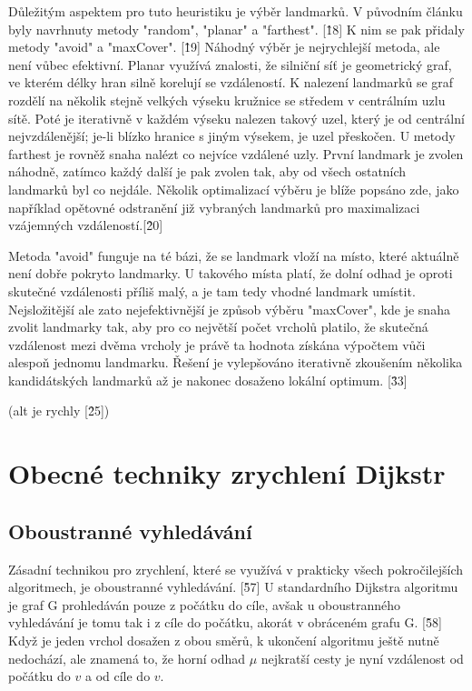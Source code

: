Důležitým aspektem pro tuto heuristiku je výběr landmarků. V původním článku byly navrhnuty metody "random", "planar" a "farthest". [\^18] K nim se pak přidaly metody "avoid" a "maxCover". [\^19] Náhodný výběr je nejrychlejší metoda, ale není vůbec efektivní. Planar využívá znalosti, že silniční síť je geometrický graf, ve kterém délky hran silně korelují se vzdáleností. K nalezení landmarků se graf rozdělí na několik stejně velkých výseku kružnice se středem v centrálním uzlu sítě. Poté je iterativně v každém výseku nalezen takový uzel, který je od centrální nejvzdálenější; je-li blízko hranice s jiným výsekem, je uzel přeskočen. U metody farthest je rovněž snaha nalézt co nejvíce vzdálené uzly. První landmark je zvolen náhodně, zatímco každý další je pak zvolen tak, aby od všech ostatních landmarků byl co nejdále. Několik optimalizací výběru je blíže popsáno zde, jako například opětovné odstranění již vybraných landmarků pro maximalizaci vzájemných vzdáleností.[\^20] 

Metoda "avoid" funguje na té bázi, že se landmark vloží na místo, které aktuálně není dobře pokryto landmarky. U takového místa platí, že dolní odhad je oproti skutečné vzdálenosti příliš malý, a je tam tedy vhodné landmark umístit. Nejsložitější ale zato nejefektivnější je způsob výběru "maxCover", kde je snaha zvolit landmarky tak, aby pro co největší počet vrcholů platilo, že skutečná vzdálenost mezi dvěma vrcholy je právě ta hodnota získána výpočtem vůči alespoň jednomu landmarku. Řešení je vylepšováno iterativně zkoušením několika kandidátských landmarků až je nakonec dosaženo lokální optimum. [\^33]

(alt je rychly [\^25])

\section{Obecné techniky zrychlení Dijkstr}
\subsection{ Oboustranné vyhledávání}
Zásadní technikou pro zrychlení, které se využívá v prakticky všech pokročilejších algoritmech, je oboustranné vyhledávání. [\^57] U standardního Dijkstra algoritmu je graf G prohledáván pouze z počátku do cíle, avšak u oboustranného vyhledávání je tomu tak i z cíle do počátku, akorát v obráceném grafu G. [\^58] Když je jeden vrchol dosažen z obou směrů, k ukončení algoritmu ještě nutně nedochází, ale znamená to, že horní odhad $\mu$ nejkratší cesty je nyní vzdálenost od počátku do $v$ a od cíle do $v$.

